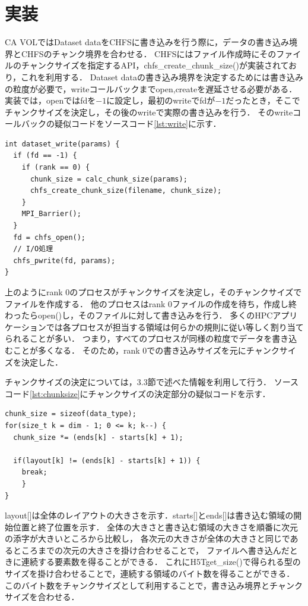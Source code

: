 \documentclass[submit,techrep,noauthor]{ipsj}
\begin{document}
\section{実装}
CA VOLではDataset dataをCHFSに書き込みを行う際に，データの書き込み境界とCHFSのチャンク境界を合わせる．
CHFSにはファイル作成時にそのファイルのチャンクサイズを指定するAPI，chfs\_create\_chunk\_size()が実装されており，これを利用する．
Dataset dataの書き込み境界を決定するためには書き込みの粒度が必要で，writeコールバックまでopen,createを遅延させる必要がある．
実装では，openではfdを$-1$に設定し，最初のwriteでfdが$-1$だったとき，そこでチャンクサイズを決定し，その後のwriteで実際の書き込みを行う．
そのwriteコールバックの疑似コードをソースコード\ref{lst:write}に示す．
\begin{lstlisting}[caption=dataset writeのコード,label=lst:write]
int dataset_write(params) {
  if (fd == -1) {
    if (rank == 0) {
      chunk_size = calc_chunk_size(params);
      chfs_create_chunk_size(filename, chunk_size);
    }
    MPI_Barrier();
  }
  fd = chfs_open();
  // I/O処理
  chfs_pwrite(fd, params);
}
\end{lstlisting}
上のようにrank 0のプロセスがチャンクサイズを決定し，そのチャンクサイズでファイルを作成する．
他のプロセスはrank 0ファイルの作成を待ち，作成し終わったらopen()し，そのファイルに対して書き込みを行う．
多くのHPCアプリケーションでは各プロセスが担当する領域は何らかの規則に従い等しく割り当てられることが多い．
つまり，すべてのプロセスが同様の粒度でデータを書き込むことが多くなる．
そのため，rank 0での書き込みサイズを元にチャンクサイズを決定した．

チャンクサイズの決定については，3.3節で述べた情報を利用して行う．
ソースコード\ref{lst:chunksize}にチャンクサイズの決定部分の疑似コードを示す．
\begin{lstlisting}[caption=チャンクサイズの決定部分のソースコード(抜粋),label=lst:chunksize]
chunk_size = sizeof(data_type);
for(size_t k = dim - 1; 0 <= k; k--) {
  chunk_size *= (ends[k] - starts[k] + 1);

  if(layout[k] != (ends[k] - starts[k] + 1)) {
    break;
	}
}
\end{lstlisting}
layout[]は全体のレイアウトの大きさを示す．starts[]とends[]は書き込む領域の開始位置と終了位置を示す．
全体の大きさと書き込む領域の大きさを順番に次元の添字が大きいところから比較し，
各次元の大きさが全体の大きさと同じであるところまでの次元の大きさを掛け合わせることで，
ファイルへ書き込んだときに連続する要素数を得ることができる．
これにH5Tget\_size()で得られる型のサイズを掛け合わせることで，連続する領域のバイト数を得ることができる．
このバイト数をチャンクサイズとして利用することで，書き込み境界とチャンクサイズを合わせる．
\end{document}
